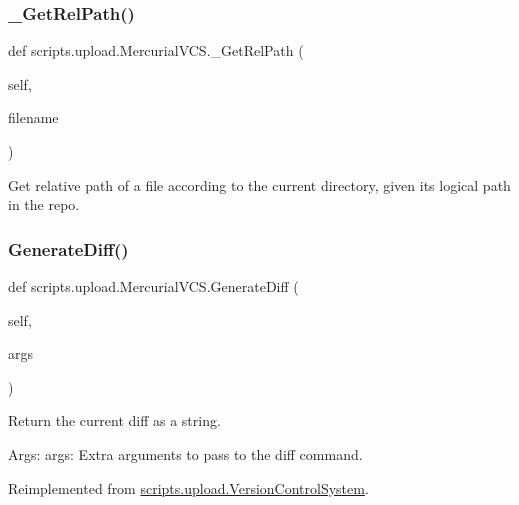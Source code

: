 \subsubsection{\texorpdfstring{\_GetRelPath()}{\_GetRelPath()}}
{\footnotesize\ttfamily def scripts.\+upload.\+Mercurial\+V\+C\+S.\+\_\+\+Get\+Rel\+Path (\begin{DoxyParamCaption}\item[{}]{self,  }\item[{}]{filename }\end{DoxyParamCaption})\hspace{0.3cm}{\ttfamily [private]}}

\begin{DoxyVerb}Get relative path of a file according to the current directory,
given its logical path in the repo.\end{DoxyVerb}
 \mbox{\label{classscripts_1_1upload_1_1_mercurial_v_c_s_a3daf7aa68fe23bc4d062553d8e46b5e3}} 
\subsubsection{\texorpdfstring{GenerateDiff()}{GenerateDiff()}}
{\footnotesize\ttfamily def scripts.\+upload.\+Mercurial\+V\+C\+S.\+Generate\+Diff (\begin{DoxyParamCaption}\item[{}]{self,  }\item[{}]{args }\end{DoxyParamCaption})}

\begin{DoxyVerb}Return the current diff as a string.

Args:
  args: Extra arguments to pass to the diff command.
\end{DoxyVerb}
 

Reimplemented from \mbox{\hyperlink{classscripts_1_1upload_1_1_version_control_system_ac687c3bb7840db1b27f323ca8d63c89b}{scripts.\+upload.\+Version\+Control\+System}}.

\mbox{\label{classscripts_1_1upload_1_1_mercurial_v_c_s_ac266a482242d3bf373da45602793f326}} 
